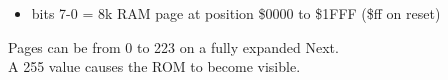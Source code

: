 \begin{itemize}
\item bits 7-0 = 8k RAM page at position \$0000 to \$1FFF (\$ff on
  reset)
\end{itemize}
Pages can be from 0 to 223 on a fully expanded Next.\\
A 255 value causes the ROM to become visible.

